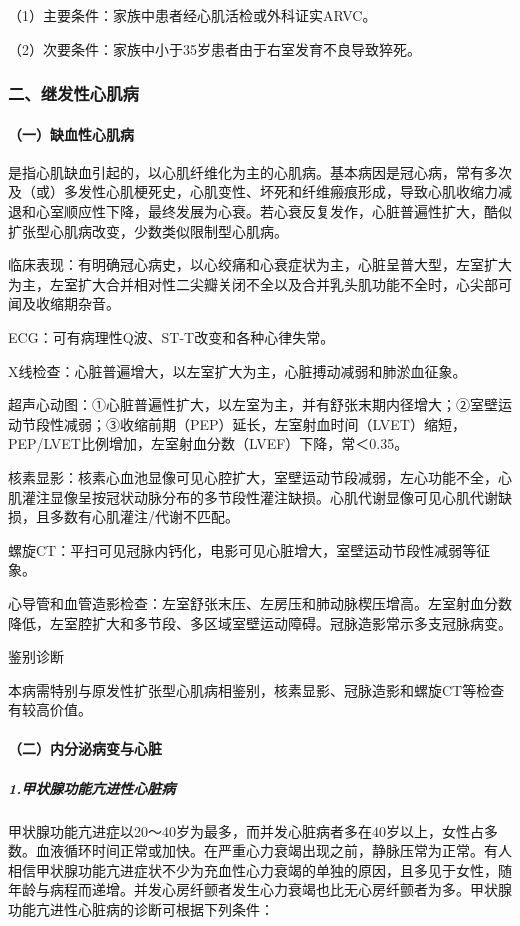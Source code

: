 （1）主要条件：家族中患者经心肌活检或外科证实ARVC。

（2）次要条件：家族中小于35岁患者由于右室发育不良导致猝死。

\subsubsection{二、继发性心肌病}

\paragraph{（一）缺血性心肌病}

是指心肌缺血引起的，以心肌纤维化为主的心肌病。基本病因是冠心病，常有多次及（或）多发性心肌梗死史，心肌变性、坏死和纤维瘢痕形成，导致心肌收缩力减退和心室顺应性下降，最终发展为心衰。若心衰反复发作，心脏普遍性扩大，酷似扩张型心肌病改变，少数类似限制型心肌病。

临床表现：有明确冠心病史，以心绞痛和心衰症状为主，心脏呈普大型，左室扩大为主，左室扩大合并相对性二尖瓣关闭不全以及合并乳头肌功能不全时，心尖部可闻及收缩期杂音。

ECG：可有病理性Q波、ST-T改变和各种心律失常。

X线检查：心脏普遍增大，以左室扩大为主，心脏搏动减弱和肺淤血征象。

超声心动图：①心脏普遍性扩大，以左室为主，并有舒张末期内径增大；②室壁运动节段性减弱；③收缩前期（PEP）延长，左室射血时间（LVET）缩短，PEP/LVET比例增加，左室射血分数（LVEF）下降，常＜0.35。

核素显影：核素心血池显像可见心腔扩大，室壁运动节段减弱，左心功能不全，心肌灌注显像呈按冠状动脉分布的多节段性灌注缺损。心肌代谢显像可见心肌代谢缺损，且多数有心肌灌注/代谢不匹配。

螺旋CT：平扫可见冠脉内钙化，电影可见心脏增大，室壁运动节段性减弱等征象。

心导管和血管造影检查：左室舒张末压、左房压和肺动脉楔压增高。左室射血分数降低，左室腔扩大和多节段、多区域室壁运动障碍。冠脉造影常示多支冠脉病变。

鉴别诊断

本病需特别与原发性扩张型心肌病相鉴别，核素显影、冠脉造影和螺旋CT等检查有较高价值。

\paragraph{（二）内分泌病变与心脏}

\subparagraph{1.甲状腺功能亢进性心脏病}

甲状腺功能亢进症以20～40岁为最多，而并发心脏病者多在40岁以上，女性占多数。血液循环时间正常或加快。在严重心力衰竭出现之前，静脉压常为正常。有人相信甲状腺功能亢进症状不少为充血性心力衰竭的单独的原因，且多见于女性，随年龄与病程而递增。并发心房纤颤者发生心力衰竭也比无心房纤颤者为多。甲状腺功能亢进性心脏病的诊断可根据下列条件：

